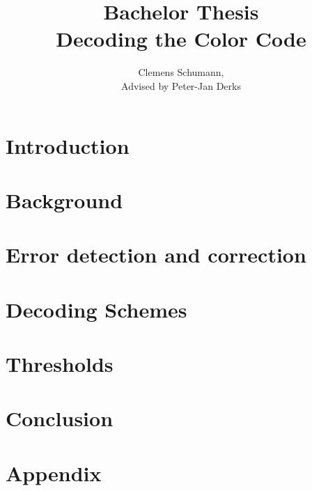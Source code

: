 \documentclass[12pt]{article}
\title{Bachelor Thesis\\ Decoding the Color Code}
\author{Clemens Schumann, \\
Advised by Peter-Jan Derks}
\begin{document}
\maketitle
\begin{abstract}
    \begin{center}
        
    \end{center}
\end{abstract}
\newpage
\tableofcontents
\newpage
\section{Introduction}

\newpage
\section{Background}

\newpage
\section{Error detection and correction}

\newpage
\section{Decoding Schemes}

\section{Thresholds}

\section{Conclusion}

\newpage


\newpage
\section{Appendix}




\end{document}
